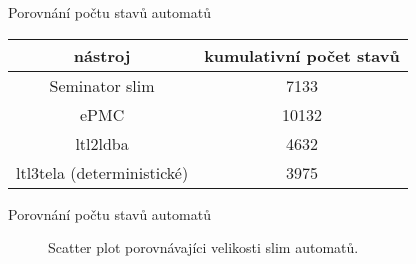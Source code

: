 \documentclass[
]{beamer}
\newcommand{\hlineny}{\hline}
\begin{document}
	\begin{frame}{Porovnání počtu stavů automatů}
		\begin{table}[ht]
			\centering
			
		
		
		\begin{tabular}{|c||c|}
			\hline
			nástroj  &   kumulativní počet stavů \\
			\hlineny
			Seminator slim          &        7133 \\
			
			\hline
			ePMC     &     10132 \\
			\hline
			ltl2ldba      &        4632 \\
			\hlineny
			ltl3tela (deterministické)&  	3975\\\hlineny
			
		\end{tabular}
\end{table}
	\end{frame}
	\begin{frame}{Porovnání počtu stavů automatů}
		\begin{figure}[ht]
			\centering
			
			\caption{Scatter plot porovnávajíci velikosti slim automatů. }
			\label{scatter:slim-epmc}
			\begin{tikzpicture}
				
			\end{tikzpicture}
		\end{figure}
	\end{frame}
	
\end{document}
